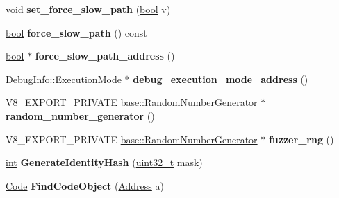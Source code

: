 \begin{DoxyCompactItemize}
void {\bfseries set\+\_\+force\+\_\+slow\+\_\+path} (\mbox{\hyperlink{classbool}{bool}} v)
\item 
\mbox{\label{classv8_1_1internal_1_1Isolate_a4c87da9ec6f5309784e3fc33c6446fc6}} 
\mbox{\hyperlink{classbool}{bool}} {\bfseries force\+\_\+slow\+\_\+path} () const
\item 
\mbox{\label{classv8_1_1internal_1_1Isolate_a39fae62fca9398d1b63acf33a469da7b}} 
\mbox{\hyperlink{classbool}{bool}} $\ast$ {\bfseries force\+\_\+slow\+\_\+path\+\_\+address} ()
\item 
\mbox{\label{classv8_1_1internal_1_1Isolate_aedfc59d2ff6e79e94782495b1343dd0c}} 
Debug\+Info\+::\+Execution\+Mode $\ast$ {\bfseries debug\+\_\+execution\+\_\+mode\+\_\+address} ()
\item 
\mbox{\label{classv8_1_1internal_1_1Isolate_aafb30a5fed0f8d9433be11ca8faefc8d}} 
V8\+\_\+\+E\+X\+P\+O\+R\+T\+\_\+\+P\+R\+I\+V\+A\+TE \mbox{\hyperlink{classv8_1_1base_1_1RandomNumberGenerator}{base\+::\+Random\+Number\+Generator}} $\ast$ {\bfseries random\+\_\+number\+\_\+generator} ()
\item 
\mbox{\label{classv8_1_1internal_1_1Isolate_af9cf39c5ddba566eeed46a1f5064a561}} 
V8\+\_\+\+E\+X\+P\+O\+R\+T\+\_\+\+P\+R\+I\+V\+A\+TE \mbox{\hyperlink{classv8_1_1base_1_1RandomNumberGenerator}{base\+::\+Random\+Number\+Generator}} $\ast$ {\bfseries fuzzer\+\_\+rng} ()
\item 
\mbox{\label{classv8_1_1internal_1_1Isolate_a2fd078dfda38b1d5bc81fafae58db702}} 
\mbox{\hyperlink{classint}{int}} {\bfseries Generate\+Identity\+Hash} (\mbox{\hyperlink{classuint32__t}{uint32\+\_\+t}} mask)
\item 
\mbox{\label{classv8_1_1internal_1_1Isolate_a7aa246cc69aac1afd17e1256a27e261c}} 
\mbox{\hyperlink{classv8_1_1internal_1_1Code}{Code}} {\bfseries Find\+Code\+Object} (\mbox{\hyperlink{classuintptr__t}{Address}} a)
\item 
\mbox{\label{classv8_1_1internal_1_1Isolate_ae52f2af4504de1a6db0e798f2887ca2f}} 

\end{DoxyCompactItemize}
